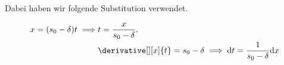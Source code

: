 \begin{solution}
\begin{enumerate}[label = \arabic*.]
    Dabei haben wir folgende Substitution verwendet.

    \begin{align*}
        x = (s_0 - \delta) t
        \implies
        & t = \frac{x}{s_0 - \delta} ,\\
        & \derivative[][x]{t} = s_0 - \delta \implies \mathrm{d}t = \frac{1}{s_0 - \delta} \mathrm{d}x
    \end{align*}

\end{enumerate}

\end{solution}

